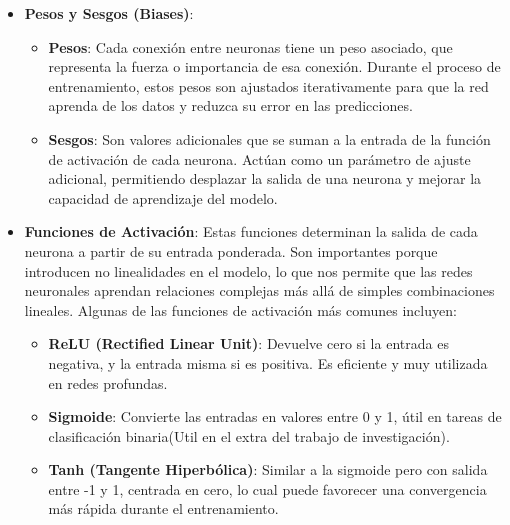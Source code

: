 \documentclass[11pt]{article} %
\begin{document}
\begin{itemize}
   \item\textbf{Pesos y Sesgos (Biases)}:
    \begin{itemize}
        \item \textbf{Pesos}: Cada conexión entre neuronas tiene un peso asociado, que representa la fuerza o importancia de esa conexión. Durante el proceso de entrenamiento, estos pesos son ajustados iterativamente para que la red aprenda de los datos y reduzca su error en las predicciones.
        \item \textbf{Sesgos}: Son valores adicionales que se suman a la entrada de la función de activación de cada neurona. Actúan como un parámetro de ajuste adicional, permitiendo desplazar la salida de una neurona y mejorar la capacidad de aprendizaje del modelo.
    \end{itemize}
    \item \textbf{Funciones de Activación}: Estas funciones determinan la salida de cada neurona a partir de su entrada ponderada. Son importantes porque introducen no linealidades en el modelo, lo que nos permite que las redes neuronales aprendan relaciones complejas más allá de simples combinaciones lineales. Algunas de las funciones de activación más comunes incluyen:
    \begin{itemize}
        \item \textbf{ReLU (Rectified Linear Unit)}: Devuelve cero si la entrada es negativa, y la entrada misma si es positiva. Es eficiente y muy utilizada en redes profundas.
        \item \textbf{Sigmoide}: Convierte las entradas en valores entre 0 y 1, útil en tareas de clasificación binaria(Util en el extra del trabajo de investigación).    
        \item \textbf{Tanh (Tangente Hiperbólica)}: Similar a la sigmoide pero con salida entre -1 y 1, centrada en cero, lo cual puede favorecer una convergencia más rápida durante el entrenamiento.
    \end{itemize}
\end{itemize}
\end{document}
